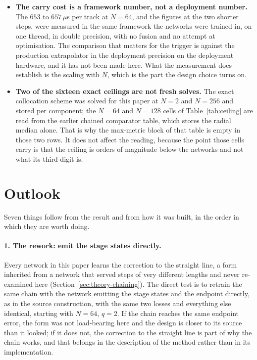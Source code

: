 \documentclass[11pt,a4paper]{article}
\begin{document}
\begin{itemize}
  the momentum-growing residual above $20$ GeV is unexplained. None of this
  moves a single network-against-reference number, because the network and the
  reference share the same equation and the same $q/p$. What it does mean is
  that the levels in Section~\ref{sec:results-truth} are the levels that decide
  whether any of this yet matters physically.
  \item \textbf{The carry cost is a framework number, not a deployment number.}
  The $653$ to $657\,\mu$s per track at $N = 64$, and the figures at the two
  shorter steps, were measured in the same framework the networks were trained
  in, on one thread, in double precision, with no fusion and no attempt at
  optimisation. The comparison that matters for the trigger is against the
  production extrapolator in the deployment precision on the deployment
  hardware, and it has not been made here. What the measurement does establish
  is the scaling with $N$, which is the part the design choice turns on.
  \item \textbf{Two of the sixteen exact ceilings are not fresh solves.} The
  exact collocation scheme was solved for this paper at $N = 2$ and $N = 256$
  and stored per component; the $N = 64$ and $N = 128$ cells of
  Table~\ref{tab:ceiling} are read from the earlier chained comparator table,
  which stores the radial median alone. That is why the max-metric block of that
  table is empty in those two rows. It does not affect the reading, because the
  point those cells carry is that the ceiling is orders of magnitude below the
  networks and not what its third digit is.
\end{itemize}

\section{Outlook}
\label{sec:outlook}

Seven things follow from the result and from how it was built, in the order in
which they are worth doing.

\paragraph{1. The rework: emit the stage states directly.} Every network in this
paper learns the correction to the straight line, a form inherited from a
network that served steps of very different lengths and never re-examined here
(Section~\ref{sec:theory-chaining}). The direct test is to retrain the same
chain with the network emitting the stage states and the endpoint directly, as
in the source construction, with the same two losses and everything else
identical, starting with $N = 64$, $q = 2$. If the chain reaches the same
endpoint error, the form was not load-bearing here and the design is closer to
its source than it looked; if it does not, the correction to the straight line
is part of why the chain works, and that belongs in the description of the
method rather than in its implementation.
\end{document}
